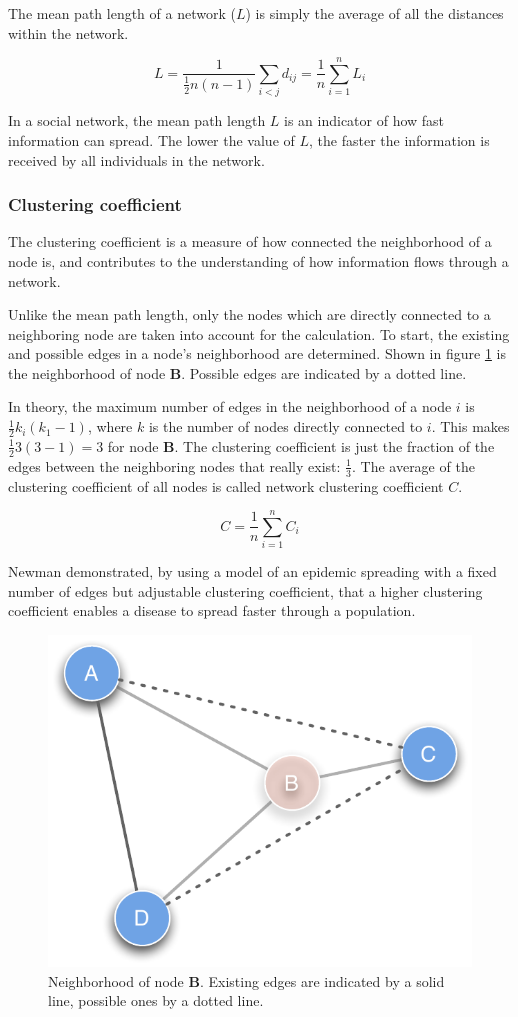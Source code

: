 The mean path length of a network ($L$) is simply the average of all the distances within the network.

\begin{equation}
L = \frac{1}{ \frac{1}{2}n(n-1)}\sum_{i<j} d_{ij} = \frac{1}{n}\sum^n_{i=1}L_i
\label{eq:mean_path_lenght}
\end{equation} 

In a social network, the mean path length $L$ is an indicator of how fast information can spread. The lower the value of $L$, the faster the information is received by all individuals in the network.  

\subsubsection{Clustering coefficient}

The clustering coefficient is a measure of how connected the neighborhood of a node is, and contributes to the understanding of how information flows through a network.

Unlike the mean path length, only the nodes which are directly connected to a neighboring node are taken into account for the calculation. To start, the existing and possible edges in a node's neighborhood are determined. Shown in figure \ref{fig:clust_coeff} is the neighborhood of node \textbf{B}. Possible edges are indicated by a dotted line.

In theory, the maximum number of edges in the neighborhood of a node $i$ is $\frac{1}{2}k_i(k_1 -1)$, where $k$ is the number of nodes directly connected to $i$. This makes $\frac{1}{2}3(3 -1) = 3$ for node \textbf{B}. The clustering coefficient is just the fraction of the edges between the neighboring nodes that really exist: $\frac{1}{3}$. The average of the clustering coefficient of all nodes is called network clustering coefficient $C$.

\begin{equation}
C = \frac{1}{n}\sum^n_{i=1}C_i
\end{equation}  

Newman\citep{newman:03} demonstrated, by using a model of an epidemic spreading with a fixed number of edges but adjustable clustering coefficient, that a higher clustering coefficient enables a disease to spread faster through a population.

\begin{figure}[htpb]
\begin{center}
  \includegraphics[width=.33\textwidth]{assets/pdf/clustering_coefficient.pdf}
  \caption[Neighborhood of node \textit{B}]{Neighborhood of node \textbf{B}. Existing edges are indicated by a solid line, possible ones by a dotted line.}
  \label{fig:clust_coeff}
\end{center}
\end{figure}
     
